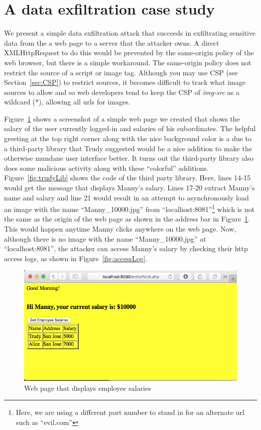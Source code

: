 \section{A data exfiltration case study \label{sec:exfil}}
We present a simple data exfiltration attack that succeeds in exfiltrating sensitive
data from the a web page to a server that the attacker owns. A direct XMLHttpRequest
to do this would be prevented by the same-origin policy of the web browser, but
there is a simple workaround. The same-origin policy does not restrict the source
of a script or image tag. Although you may use CSP (see Section~\ref{sec:CSP}) to
restrict sources, it becomes difficult to track what image sources to allow and
so web developers tend to keep the CSP of \textit{img-src} as a wildcard (*),
allowing all urls for images.

Figure~\ref{fig:salaryMgr} shows a screenshot of a simple web page we created
that shows the salary of the user currently logged-in and salaries of his subordinates.
The helpful greeting at the top right corner along with the nice background color
is a due to a third-party library that Trudy suggested would be a nice addition
to make the otherwise mundane user interface better. It turns out the third-party
library also does some malicious activity along with these ``colorful'' additions.
Figure~\ref{fig:trudyLib} shows the code of the third party library. Here, lines
14-15 would get the message that displays Manny's salary. Lines 17-20 extract Manny's
name and salary and line 21 would result in an attempt to asynchronously load an
image with the name ``Manny\_10000.jpg'' from ``localhost:8081''\footnote{Here,
we are using a different port number to stand in for an alternate url such as
``evil.com''} which is not the same as the origin of the web page as shown in the
address bar in Figure~\ref{fig:salaryMgr}. This would happen anytime Manny clicks
anywhere on the web page. Now, although there is no image with the name ``Manny\_10000.jpg''
at ``localhost:8081'', the attacker can access Manny's salary by checking their
http access logs, as shown in Figure~\ref{fig:accessLog}.

\begin{figure}
  \centering
  \includegraphics[scale=0.5, frame]{images/scrShot1}
  \caption{Web page that displays employee salaries}
  \label{fig:salaryMgr}
\end{figure}

